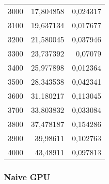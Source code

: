 \begin{tabular}{r r r}
3000 & 17,804858 & 0,024317 \\
3100 & 19,637134 & 0,017677 \\
3200 & 21,580045 & 0,037946 \\
3300 & 23,737392 & 0,07079 \\
3400 & 25,977898 & 0,012364 \\
3500 & 28,343538 & 0,042341 \\
3600 & 31,180217 & 0,113045 \\
3700 & 33,803832 & 0,033084 \\
3800 & 37,478187 & 0,154286 \\
3900 & 39,98611 & 0,102763 \\
4000 & 43,48911 & 0,097813 \\
\end{tabular}

\subsubsection{Naive GPU}

